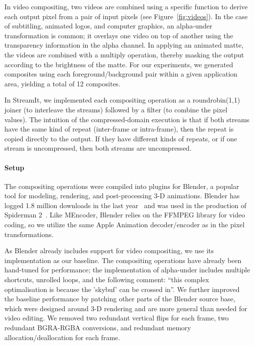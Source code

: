 In video compositing, two videos are combined using a specific
function to derive each output pixel from a pair of input pixels (see
Figure~\ref{fig:videos}).  In the case of subtitling, animated logos,
and computer graphics, an alpha-under transformation is common; it
overlays one video on top of another using the transparency
information in the alpha channel.  In applying an animated matte, the
videos are combined with a multiply operation, thereby masking the
output according to the brightness of the matte.  For our experiments,
we generated composites using each foreground/background pair within a
given application area, yielding a total of 12 composites.

In StreamIt, we implemented each compositing operation as a
roundrobin(1,1) joiner (to interleave the streams) followed by a
filter (to combine the pixel values).  The intuition of the
compressed-domain execution is that if both streams have the same kind
of repeat (inter-frame or intra-frame), then the repeat is copied
directly to the output.  If they have different kinds of repeats, or
if one stream is uncompressed, then both streams are uncompressed.

\paragraph*{Setup} The compositing operations were compiled into plugins for
Blender, a popular tool for modeling, rendering, and post-processing
3-D animations.  Blender has logged 1.8 million downloads in the last
year~\cite{blender-stats} and was used in the production of Spiderman
2~\cite{blender-wikipedia}.  Like MEncoder, Blender relies on the
FFMPEG library for video coding, so we utilize the same Apple
Animation decoder/encoder as in the pixel transformations.

As Blender already includes support for video compositing, we use its
implementation as our baseline.  The compositing operations have
already been hand-tuned for performance; the implementation of
alpha-under includes multiple shortcuts, unrolled loops, and the
following comment: ``this complex optimalisation is because the
'skybuf' can be crossed in''.  We further improved the baseline
performance by patching other parts of the Blender source base, which
were designed around 3-D rendering and are more general than needed
for video editing.  We removed two redundant vertical flips for each
frame, two redundant BGRA-RGBA conversions, and redundant memory
allocation/deallocation for each frame.

